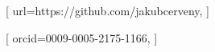 \author[]{Jakub \v{C}erven\'{y}}[%
url=https://github.com/jakubcerveny,
]
\author[]{Zzyv Zzyzek}[%
orcid=0009-0005-2175-1166,
]
